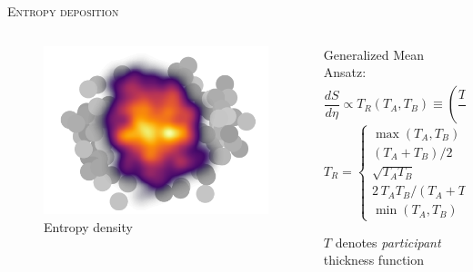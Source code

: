 \documentclass[aspectratio=169]{beamer}
\begin{document}
\begin{frame}[t]{\scshape Entropy deposition}
  \begin{columns}[T]
    \begin{column}{.5\textwidth}
      \begin{figure}
        \includegraphics[width=\textwidth]{trento_entropy}\\
        \small Entropy density
      \end{figure}
    \end{column}
    \begin{column}{.5\textwidth}
      \bigskip \centering
      \textcolor{theme}{Generalized Mean Ansatz:}
      \begin{equation*}
        \frac{dS}{d\eta} \propto T_R(T_A, T_B) \equiv
        \left(\frac{T_A^p + T_B^p}{2}\right)^{1/p}
      \end{equation*}
      \begin{equation*}
        T_R =
        \begin{cases}
          \max(T_A, T_B) & p \rightarrow +\infty, \\[.5ex]
          (T_A + T_B)/2 & p = +1, \\[.5ex]
          \sqrt{T_A T_B} & p = 0, \\[.5ex]
          2\, T_A T_B/(T_A + T_B) & p = -1, \\[.5ex]
          \min(T_A, T_B) & p \rightarrow -\infty.
        \end{cases}
      \end{equation*}
      \begin{center}
        \smallskip \small $T$ denotes \emph{participant} thickness function
      \end{center}
    \end{column}
  \end{columns}
\end{frame}
\end{document}
